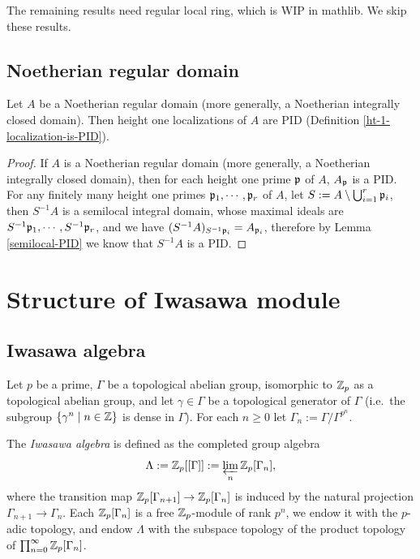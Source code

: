 The remaining results need regular local ring,
which is WIP in mathlib. We skip these results.

\subsection{Noetherian regular domain}

\begin{prop}
\label{regular-domain-is-good}
\leanok
{}
Let $A$ be a Noetherian regular domain
(more generally, a Noetherian integrally closed domain).
Then height one localizations of $A$ are PID
(Definition \ref{ht-1-localization-is-PID}).
\end{prop}

\begin{proof}
\leanok
If $A$ is a Noetherian regular domain
(more generally, a Noetherian integrally closed domain),
then for each height one prime ${\mathfrak{p}}$ of $A$,
$A_{\mathfrak{p}}$ is a PID.
For any finitely many height one primes ${\mathfrak{p}}_1,\cdots,{\mathfrak{p}}_r$ of $A$,
let $S:=A\setminus\bigcup_{i=1}^r{\mathfrak{p}}_i$,
then $S^{-1}A$ is a semilocal integral domain, whose
maximal ideals are $S^{-1}{\mathfrak{p}}_1,\cdots,S^{-1}{\mathfrak{p}}_r$,
and we have $(S^{-1}A)_{S^{-1}{\mathfrak{p}}_i}=A_{{\mathfrak{p}}_i}$,
therefore by Lemma \ref{semilocal-PID} we know that $S^{-1}A$ is a PID.
\end{proof}

\section{Structure of Iwasawa module}

\subsection{Iwasawa algebra}

Let $p$ be a prime,
$\Gamma$ be a topological abelian group, isomorphic to ${\mathbb {Z}}_p$
as a topological abelian group, and let $\gamma\in\Gamma$ be a topological generator
of $\Gamma$ (i.e.~the subgroup $\{\gamma^n\mid n\in{\mathbb {Z}}\}$ is dense in $\Gamma$).
For each $n\geq 0$ let $\Gamma_n:=\Gamma/\Gamma^{p^n}$.

\begin{definition}
\label{Iwasawa-alg-defn}
The \emph{Iwasawa algebra} is defined as the completed group algebra
$$
\Lambda:={\mathbb {Z}}_p[[\Gamma]]:=\varprojlim_n{\mathbb {Z}}_p[\Gamma_n],
$$
where the transition map ${\mathbb {Z}}_p[\Gamma_{n+1}]\to
{\mathbb {Z}}_p[\Gamma_n]$ is induced by the natural projection
$\Gamma_{n+1}\to\Gamma_n$.
Each ${\mathbb {Z}}_p[\Gamma_n]$ is a free ${\mathbb {Z}}_p$-module of rank $p^n$,
we endow it with the $p$-adic topology,
and endow $\Lambda$ with the subspace topology
of the product topology of $\prod_{n=0}^\infty{\mathbb {Z}}_p[\Gamma_n]$.
\end{definition}

